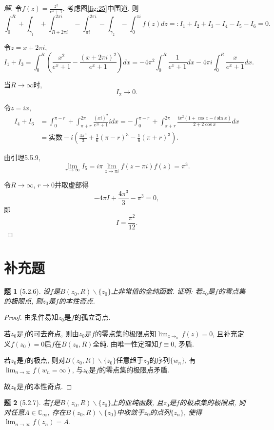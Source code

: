 \documentclass{article}[a4paper, 12pt]
\theoremstyle{mystyle}
\newtheorem{problem}{题}
\newenvironment{solution}{\begin{proof}[解]}{\end{proof}}
\begin{document}
\begin{solution}
  令\(f(z)=\frac{z^2}{e^z+1}\). 考虑图\ref{fig:25}中围道. 则\[\int_{0}^{R}+\int_{\gamma_1}+\int_{R+2\pi i}^{2\pi i}-\int_{\pi i}^{2\pi i}-\int_{\gamma_2}-\int_{0}^{\pi i} f(z)dz=:I_1+I_2+I_3-I_4-I_5-I_6=0.\]

  令\(z=x+2\pi i\), \[I_1+I_3=\int_0^R\left(\frac{x^2}{e^x+1}-\frac{(x+2\pi i)^2}{e^x+1}\right)dx=-4\pi^2\int_0^R\frac{1}{e^x+1}dx-4\pi i\int_0^R \frac{x}{e^x+1}dx.\]

  当\(R\to\infty\)时, \[I_2\to 0.\]

  令\(z=ix\), \begin{align*}I_4+I_6&=\int_{0}^{\pi-r}+\int_{\pi+r}^{2\pi} \frac{(xi)^2}{e^{xi}+1}idx=-\int_{0}^{\pi-r}+\int_{\pi+r}^{2\pi}\frac{ix^2(1+\cos x-i\sin x)}{2+2\cos x}dx\\&=\text{实数}-i\left(\frac{4\pi^3}{3}+\frac{1}{6}(\pi-r)^3-\frac{1}{6}(\pi+r)^3\right).\end{align*}

  由引理5.5.9, \[\lim_{r\to\infty}I_5=i\pi\lim_{z\to\pi i}f(z-\pi i)f(z)=\pi^3.\]

  令\(R\to\infty\), \(r\to0\)并取虚部得\[-4\pi I+\frac{4\pi^3}{3}-\pi^3=0,\]
  即\[I=\frac{\pi^2}{12}. \tag*{\(\qed\)}\]
  \renewcommand{\qedsymbol}{}
\end{solution}

\section{补充题}

\begin{problem}[5.2.6]
  设\(f\)是\(B(z_0,R)\backslash\{z_0\}\)上非常值的全纯函数. 证明: 若\(z_0\)是\(f\)的零点集的极限点, 则\(z_0\)是\(f\)的本性奇点.
\end{problem}

\begin{proof}
  由条件易知\(z_0\)是\(f\)的孤立奇点.
  
  若\(z_0\)是\(f\)的可去奇点, 则由\(z_0\)是\(f\)的零点集的极限点知\(\lim_{z\to _0}f(z)=0\), 且补充定义\(f(z_0)=0\)后\(f\)在\(B(z_0,R)\)全纯. 由唯一性定理知\(f\equiv0\), 矛盾.
  
  若\(z_0\)是\(f\)的极点, 则对\(B(z_0,R)\backslash\{z_0\}\)任意趋于\(z_0\)的序列\(\{w_n\}\), 有\(\lim_{n\to\infty}f(w_n=\infty)\), 与\(z_0\)是\(f\)的零点集的极限点矛盾.
  
  故\(z_0\)是\(f\)的本性奇点.
\end{proof}

\begin{problem}[5.2.7]
  若\(f\)是\(B(z_0,R)\backslash\{z_0\}\)上的亚纯函数, 且\(z_0\)是\(f\)的极点集的极限点, 则对任意\(A\in\mathbb{C}_\infty\), 存在\(B(z_0,R)\backslash\{z_0\}\)中收敛于\(z_0\)的点列\(\{z_n\}\), 使得\(\lim_{n\to\infty}f(z_n)=A\).
\end{problem}
\end{document}
